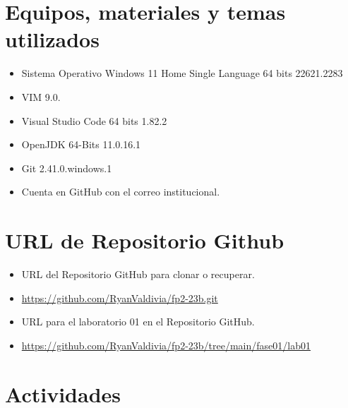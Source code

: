 \documentclass{article}
\begin{document}
	\section{Equipos, materiales y temas utilizados}
	\begin{itemize}
		\item Sistema Operativo Windows 11 Home Single Language 64 bits 22621.2283
		\item VIM 9.0.
		\item Visual Studio Code 64 bits 1.82.2
		\item OpenJDK 64-Bits 11.0.16.1
		\item Git 2.41.0.windows.1
		\item Cuenta en GitHub con el correo institucional. 
	\end{itemize}
	
	\section{URL de Repositorio Github}
	\begin{itemize}
		\item URL del Repositorio GitHub para clonar o recuperar.
		\item \url{https://github.com/RyanValdivia/fp2-23b.git}
		\item URL para el laboratorio 01 en el Repositorio GitHub.
		\item \url{https://github.com/RyanValdivia/fp2-23b/tree/main/fase01/lab01}
	\end{itemize}
	
	\section{Actividades}
	
\end{document}
